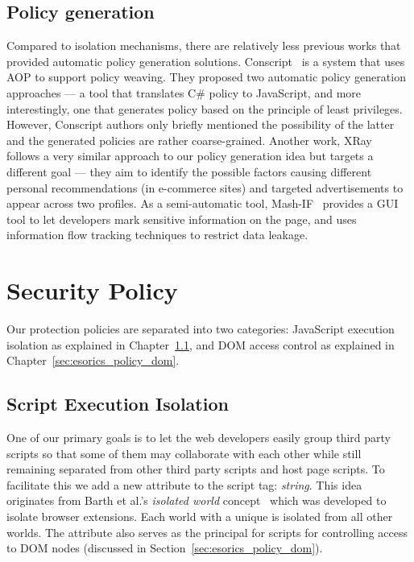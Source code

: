 \subsection{Policy generation}\label{sec:esoricsRelatedPolicy} Compared to isolation mechanisms, there are relatively less previous works that provided automatic policy generation solutions.  Conscript~\cite{Conscript} is a system that uses AOP to support policy weaving.  They proposed two automatic policy generation approaches --- a tool that translates C\# policy to JavaScript, and more interestingly, one that generates policy based on the principle of least privileges.  However, Conscript authors only briefly mentioned the possibility of the latter and the generated policies are rather coarse-grained.  Another work, XRay\footnotemark[1]~\cite{XRay} follows a very similar approach to our policy generation idea but targets a different goal --- they aim to identify the possible factors causing different personal recommendations (in e-commerce sites) and targeted advertisements to appear across two profiles.  As a semi-automatic tool, Mash-IF~\cite{MashIF} provides a GUI tool to let developers mark sensitive information on the page, and uses information flow tracking techniques to restrict data leakage.  


\renewcommand{\thefootnote}{\arabic{footnote}}

\section{Security Policy}
\label{sec:esorics_policy}

Our protection policies are separated into two categories: JavaScript execution isolation as explained in Chapter~\ref{sec:esorics_policy_iso}, and DOM access control as explained in Chapter~\ref{sec:esorics_policy_dom}.

\subsection{Script Execution Isolation} 
\label{sec:esorics_policy_iso}
One of our primary goals is to let the web developers easily group third party scripts so that some of them may collaborate with each other while still remaining separated from other third party scripts and host page scripts.  To facilitate this we add a new attribute to the script tag: \emph{string}.  This idea originates from Barth et al.'s \emph{isolated world} concept~\cite{extension} which was developed to isolate browser extensions.  Each world with a unique  is isolated from all other worlds.  The  attribute also serves as the principal for scripts for controlling access to DOM nodes (discussed in Section~\ref{sec:esorics_policy_dom}).
\lstset{xleftmargin=.25\textwidth,xrightmargin=.1\textwidth}


